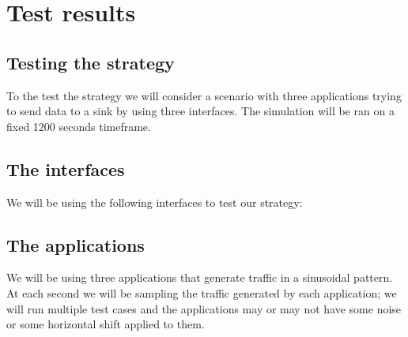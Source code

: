 
\section{Test results}

\subsection{Testing the strategy}
To the test the strategy we will consider a scenario with three applications trying to send data to a sink by using three interfaces.
The simulation will be ran on a fixed 1200 seconds timeframe. \\



\subsection{The interfaces}

We will be using the following interfaces to test our strategy:

\begin{table}[h]
	\centering
\end{table}

\subsection{The applications}
We will be using three applications that generate traffic in a sinusoidal pattern. \\ 
At each second we will be sampling the traffic generated by each application; we will run multiple test cases and the applications may or may not have some noise or some horizontal shift applied to them.
